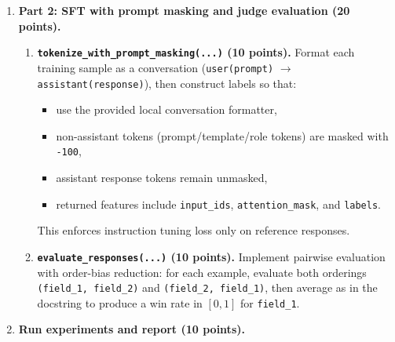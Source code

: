 \begin{Q}
\begin{enumerate}
\begin{enumerate}
\item \textbf{\texttt{generate\_data(...)} (10 points).}
Generate a dataset of exactly \texttt{num} rows in the format
\[
\{\texttt{"prompt"}:\ldots,\ \texttt{"response"}:\ldots\}.
\]
Convert each accepted self-instruct example as follows:
\begin{itemize}
\item if \texttt{input==""}, use \texttt{prompt = instruction},
\item otherwise use \texttt{prompt = instruction + "\\textbackslash nInput: ..."},
\item use \texttt{response = output}.
\end{itemize}
Return a Hugging Face \texttt{Dataset} with exactly \texttt{num} examples.
\end{enumerate}

\item \textbf{Part 2: SFT with prompt masking and judge evaluation (20 points).}

\begin{enumerate}
\item \textbf{\texttt{tokenize\_with\_prompt\_masking(...)} (10 points).}
Format each training sample as a conversation
(\texttt{user(prompt)} $\rightarrow$ \texttt{assistant(response)}), then construct labels so that:
\begin{itemize}
\item use the provided local conversation formatter,
\item non-assistant tokens (prompt/template/role tokens) are masked with \texttt{-100},
\item assistant response tokens remain unmasked,
\item returned features include \texttt{input\_ids}, \texttt{attention\_mask}, and \texttt{labels}.
\end{itemize}
This enforces instruction tuning loss only on reference responses.

\item \textbf{\texttt{evaluate\_responses(...)} (10 points).}
Implement pairwise evaluation with order-bias reduction:
for each example, evaluate both orderings
\texttt{(field\_1, field\_2)} and \texttt{(field\_2, field\_1)},
then average as in the docstring to produce a win rate in $[0,1]$ for \texttt{field\_1}.
\end{enumerate}

\item \textbf{Run experiments and report (10 points).}


\end{enumerate}
\end{Q}
